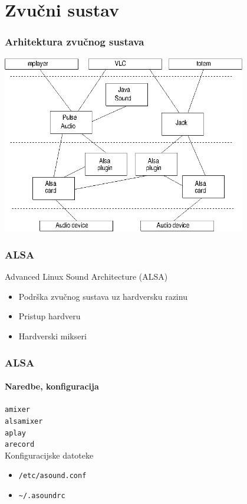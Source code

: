 \documentclass[t,table,usenames,dvipsnames]{beamer}
\begin{document}
\section{Zvučni sustav}


\begin{frame}
	\frametitle{Arhitektura zvučnog sustava}
	\centering
	\includegraphics[width=0.8\textwidth]{sound_arch.png}
\end{frame}


\begin{frame}
	\frametitle{ALSA}
	Advanced Linux Sound Architecture (ALSA)\\
	\vfill
	\begin{itemize}
		\item Podrška zvučnog sustava uz hardversku razinu
		\item Pristup hardveru
		\item Hardverski mikseri
	\end{itemize}
	\vfill
\end{frame}


\begin{frame}
	\frametitle{ALSA}
	\framesubtitle{Naredbe, konfiguracija}
	\texttt{amixer}\\
	\texttt{alsamixer}\\
	\vfill
	\texttt{aplay}\\
	\texttt{arecord}\\
	\vfill
	Konfiguracijske datoteke
	\begin{itemize}
		\item[] \texttt{/etc/asound.conf}
		\item[] \texttt{\textasciitilde/.asoundrc}
	\end{itemize}
	\vfill
\end{frame}
\end{document}
